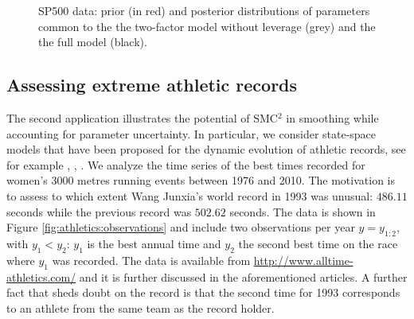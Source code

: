 \documentclass{statsoc}
\newcommand{\SMCSQ}{SMC$^2$\xspace}
\begin{document}
\begin{figure}[H]
 \centering
 \caption{SP500 data: prior (in red)  	and posterior distributions of parameters common to the 
the two-factor model without leverage (grey) and the 
the full model (black). \label{fig:SP500:modelcomparison:twofactor}}
\end{figure}



  \subsection{Assessing extreme athletic records}

The second application illustrates the potential
of \SMCSQ in smoothing while accounting for 
parameter uncertainty. In particular, we consider 
state-space models that have been proposed for the dynamic evolution
of athletic records, see for example
\cite{RobinsonTawn1995},
\cite{GaetanGrigoletto2004}, \cite{fearnhead2010smoothinglinear}. 
We analyze the time series of the best times recorded for women's 3000 metres
running events between 1976 and 2010. The motivation is to assess to which
extent
Wang Junxia's world record in 1993 was unusual: $486.11$ seconds while
the previous  record was $502.62$ seconds. The data  is shown in
Figure \ref{fig:athletics:observations} and  include two observations
per year $y = y_{1:2}$, with $y_1
< y_2$: $y_1$ is the best annual time and $y_2$ the second best time on the race
where $y_1$ was recorded.  The data is available from
\href{http://www.alltime-athletics.com/}{http://www.alltime-athletics.com/}
and it is further discussed in the aforementioned articles. A further fact
that sheds doubt on the record is that the second time for 1993 corresponds to
an athlete from the same team as the record holder. 
\end{document}
